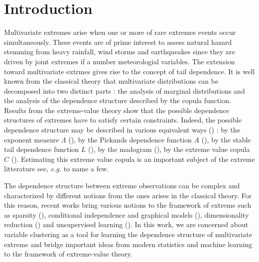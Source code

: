 \documentclass[11pt]{article}
\begin{document}
	\section{Introduction}
	Multivariate extremes arise when one or more of rare extremes events occur simultaneously. These events are of prime interest to assess natural hazard stemming from heavy rainfall, wind storms and earthqueakes since they are driven by joint extremes if a number meteorologial variables. The extension toward multivariate extrmes gives rise to the concept of tail dependence. It is well known from the classical theory that multivariate distributions can be decomposed into two distinct parts : the analysis of marginal distributions and the analysis of the dependence structure described by the copula function. Results from the extreme-value theory show that the possible dependence structures of extremes have to satisfy certain constraints. Indeed, the possible dependence structure may be described in various equivalent ways (\cite{resnick2008extreme, beirlant2004statistics, de2006extreme}) : by the exponent measure $\Lambda$ (\cite{balkema1977max}), by the Pickands dependence function $A$ (\cite{pickands1981multivariate}), by the stable tail dependence function $L$ (\cite{huang1992statistics}), by the madogram (\cite{naveau2009modelling}), by the extreme value copula $C$ (\cite{gudendorf2010}). Estimating this extreme value copula is an important subject of the extreme litterature see, \emph{e.g.} \cite{bucher2011new, gudendorf2012nonparametric, MARCON20171, escobar2018local} to name a few.
	
	The dependence structure between extreme observations can be complex and characterized by different notions from the ones arises in the classical theory. For this reason, recent works bring various notions to the framework of extreme such as sparsity (\cite{goix2015learning, simpson2020determining, meyer2021sparse}), conditional independence and graphical models (\cite{gissibl2018max, engelke2020graphical, segers2020one}), dimensionality reduction (\cite{chautru2015dimension, drees2021principal}) and unsupervised learning (\cite{cooley2019decompositions, janssen2020k}). In this work, we are concerned about variable clustering as a tool for learning the dependence structure of multivariate extreme and bridge important ideas from modern statistics and machine learning to the framework of extreme-value theory.
	
\end{document}
